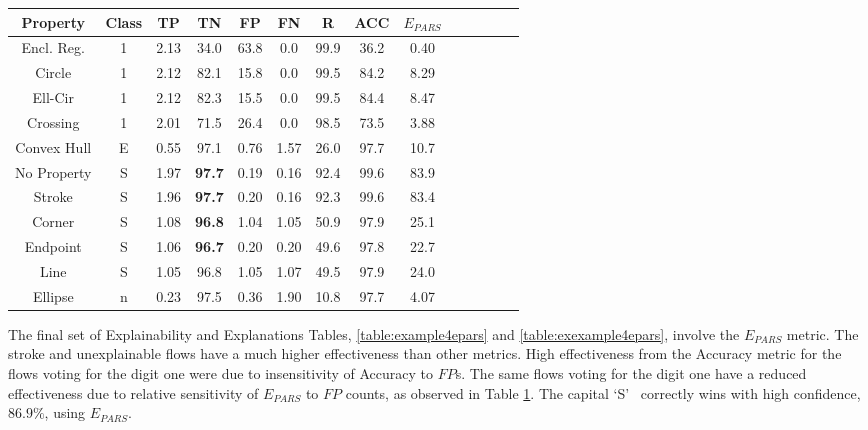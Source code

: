 \begin{table}[H]
    \renewcommand{\arraystretch}{1.3}
    \label{table:example4eff_metrics} 
    \begin{center}
    \begin{tabular}{| c | c | c | c | c | c | c | c | c | c | c | c | c | c |}
    \hline
    Property & Class & TP & TN & FP & FN & R & ACC & $E_{PARS}$ \\
    \hline
    \hline
    Encl. Reg. & 1 & 2.13 & 34.0 & 63.8 & 0.0 & 99.9 & 36.2 & 0.40 \\ 
    \hline
    Circle & 1 & 2.12 & 82.1 & 15.8 & 0.0 & 99.5 & 84.2 &  8.29 \\
    \hline
    Ell-Cir & 1 & 2.12 & 82.3 & 15.5 & 0.0 & 99.5 & 84.4 & 8.47 \\
    \hline
    Crossing & 1 & 2.01 & 71.5 & 26.4 & 0.0 & 98.5 & 73.5 & 3.88 \\
    \hline
    Convex Hull & E & 0.55 & 97.1 & 0.76 & 1.57 & 26.0 & 97.7 & 10.7 \\
    \hline
    No Property & S & 1.97 & \bf{97.7} & 0.19 & 0.16 & 92.4 & 99.6 & 83.9 \\
    \hline
    Stroke & S & 1.96 & \bf{97.7} & 0.20 & 0.16 & 92.3 & 99.6 & 83.4 \\
    \hline
    Corner & S & 1.08 & \bf{96.8} & 1.04 & 1.05 & 50.9 & 97.9 & 25.1 \\
    \hline
    Endpoint & S & 1.06 & \bf{96.7} & 0.20 & 0.20 & 49.6 & 97.8 & 22.7 \\
    \hline
    Line & S & 1.05 & 96.8 & 1.05 & 1.07 & 49.5 & 97.9 & 24.0 \\
    \hline
    Ellipse & n & 0.23 & 97.5 & 0.36 & 1.90 & 10.8 & 97.7 & 4.07 \\
    \hline
    \end{tabular}
    \end{center}
\end{table}

The final set of Explainability and Explanations Tables,
\ref{table:example4epars} and \ref{table:exexample4epars}, involve the
$E_{PARS}$ metric. The stroke and unexplainable flows have a much higher
effectiveness than other metrics.  High effectiveness from the Accuracy
metric for the flows voting for the digit one were due to insensitivity of
Accuracy to $FP$s.  The same flows voting for the digit one have a reduced
effectiveness due to relative sensitivity of $E_{PARS}$ to $FP$ counts, as
observed in Table \ref{table:example4eff_metrics}.  The capital \lq{S}\rq~
correctly wins with high confidence, $86.9\%$, using $E_{PARS}$.


